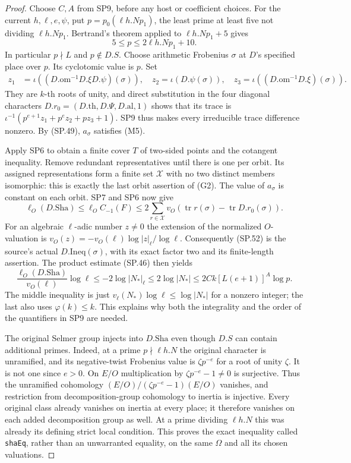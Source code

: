 \begin{proof}
Choose $C,A$ from SP9, before any host or coefficient choices.
For the current $h,\ell,e,\psi$, put
$p=p_0(\ell h.Np_1)$, the least prime at least five not dividing
$\ell h.Np_1$.  Bertrand's theorem applied to $\ell h.Np_1+5$
gives
\[
                    5\le p\le2\ell h.Np_1+10.
 \tag{SP.51}
\]
In particular $p\nmid L$ and $p\notin D.S$.  Choose arithmetic
Frobenius $\sigma$ at $D$'s specified place over $p$.  Its
cyclotomic value is $p$.  Set
\[
 \begin{aligned}
 z_1&=\iota((D.\mathrm{om}^{-1}D.\xi D.\psi)(\sigma)),\quad
 z_2=\iota(D.\psi(\sigma)),\quad
 z_3=\iota((D.\mathrm{om}^{-1}D.\xi)(\sigma)).
 \end{aligned}
\]
They are $k$-th roots of unity, and direct substitution in the four
diagonal characters $D.r_0=(D.\mathrm{th},D.\Psi,D.\mathrm{al},1)$
shows that its trace is
$\iota^{-1}(p^{e+1}z_1+p^ez_2+pz_3+1)$.
SP9 thus makes every irreducible trace difference nonzero.
By (SP.49), $a_\sigma$ satisfies (M5).

Apply SP6 to obtain a finite cover $T$ of two-sided points and the
cotangent inequality.  Remove redundant representatives until
there is one per orbit.  Its assigned representations form a
finite set $\mathcal X$ with no two distinct members isomorphic:
this is exactly the last orbit assertion of (G2).  The value of
$a_\sigma$ is constant on each orbit.  SP7 and SP6 now give
\[
 \ell_O(D.\mathrm{Sha})
       \le\ell_OC_{-1}(F)
       \le2\sum_{r\in\mathcal X}
                 v_O(\operatorname{tr}r(\sigma)
                                  -\operatorname{tr}D.r_0(\sigma)).
 \tag{SP.52}
\]
For an algebraic $\ell$-adic number $z\ne0$ the extension of the
normalized $O$-valuation is
$v_O(z)=-v_O(\ell)\log|z|_\ell/\log\ell$.
Consequently (SP.52) is the source's actual $D.\mathrm{Ineq}(\sigma)$,
with its exact factor two and its finite-length assertion.
The product estimate (SP.46) then yields
\[
 \frac{\ell_O(D.\mathrm{Sha})}{v_O(\ell)}\log\ell
 \le -2\log|N_*|_\ell
 \le 2\log|N_*|
 \le 2Ck[L(e+1)]^A\log p.
 \tag{SP.53}
\]
The middle inequality is just
$v_\ell(N_*)\log\ell\le\log|N_*|$ for a nonzero integer;
the last also uses $\varphi(k)\le k$.  This explains why both the
integrality and the order of the quantifiers in SP9 are needed.

The original Selmer group injects into $D.\mathrm{Sha}$ even
though $D.S$ can contain additional primes.  Indeed, at a prime
$p\nmid\ell h.N$ the original character is unramified, and its
negative-twist Frobenius value is $\zeta p^{-e}$ for a root of
unity $\zeta$.  It is not one since $e>0$.  On $E/O$ multiplication
by $\zeta p^{-e}-1\ne0$ is surjective.  Thus the unramified
cohomology
$(E/O)/(\zeta p^{-e}-1)(E/O)$ vanishes, and restriction from
decomposition-group cohomology to inertia is injective.
Every original class already vanishes on inertia at every place;
it therefore vanishes on each added decomposition group as well.
At a prime dividing $\ell h.N$ this was already its defining
strict local condition.  This proves the exact inequality called
\texttt{shaEq}, rather than an unwarranted equality, on the same
$\Omega$ and all its chosen valuations.


\end{proof}
